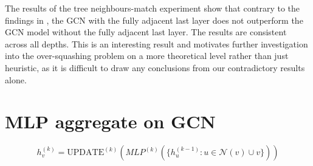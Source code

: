\documentclass[a4paper,12pt]{article}
\begin{document}
The results of the tree neighbours-match experiment show that contrary to the findings in \cite{alon_bottleneck_2021}, the GCN with the fully adjacent last layer does not outperform the GCN model without the fully adjacent last layer. The results are consistent across all depths. This is an interesting result and motivates further investigation into the over-squashing problem on a more theoretical level rather than just heuristic, as it is difficult to draw any conclusions from our contradictory results alone.


\section{MLP aggregate on GCN}
\[
	h_v^{(k)} = \text{UPDATE}^{(k)} \left(MLP^{(k)}(\{ h_u^{(k-1)}: u \in \mathcal{N}(v) \cup v \}) \right)
\]

\printbibliography
\end{document}
